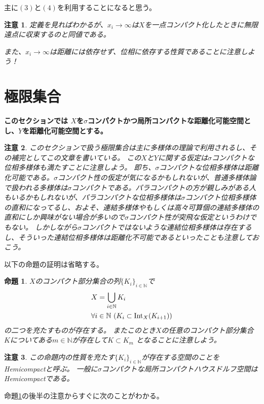\documentclass[leqno]{jsarticle}
\newtheorem{prop}[thm]{命題}
\newtheorem*{cau}{注意}
\newcommand{\nn}{\mathbb{N}}
\newcommand{\nai}{\text{{\rm Int}}}
\begin{document}
主に$(3)$と$(4)$を利用することになると思う。
\begin{cau}
定義を見ればわかるが、$x_i\to \infty$は$X$を一点コンパクト化したときに無限遠点に収束するのと同値である。
\par
また、$x_i\to\infty$は距離には依存せず、位相に依存する性質であることに注意しよう！
\end{cau}

\section{極限集合}

\textbf{このセクションでは
$X$を$\sigma$コンパクトかつ局所コンパクトな距離化可能空間とし、$Y$を距離化可能空間とする。}
\begin{cau}
このセクションで扱う極限集合は主に多様体の理論で利用されるし、その補完としてこの文章を書いている。
この$X$と$Y$に関する仮定は$\sigma$コンパクトな位相多様体も満たすことに注意しよう。
即ち、$\sigma$コンパクトな位相多様体は距離化可能である。$\sigma$コンパクト性の仮定が気になるかもしれないが、普通多様体論で扱われる多様体は$\sigma$コンパクトである。パラコンパクトの方が親しみがある人もいるかもしれないが、パラコンパクトな位相多様体は$\sigma$コンパクト位相多様体の直和になってるし、およそ、連結多様体やもしくは高々可算個の連結多様体の直和にしか興味がない場合が多いので$\sigma$コンパクト性が突飛な仮定というわけでもない。
しかしながら$\sigma$コンパクトではないような連結位相多様体は存在するし、そういった連結位相多様体は距離化不可能であるといったことも注意しておこう。
\end{cau}
以下の命題の証明は省略する。
\begin{prop}\label{cpt}
$X$のコンパクト部分集合の列$\{K_i\}_{i\in \nn}$で
\begin{align*}
& X=\bigcup_{i\in \nn}K_i\\
& \forall i\in \nn\ (K_i\subset \nai_X(K_{i+1}))
\end{align*}
の二つを充たすものが存在する。
またこのとき$X$の任意のコンパクト部分集合$K$についてある$m\in \nn$が存在して$K\subset K_m$
となることに注意しよう。
\end{prop}
\begin{cau}
この命題内の性質を充たす$\{K_i\}_{i\in \nn}$が存在する空間のことを\emph{Hemicompact}と呼ぶ。
一般に$\sigma$コンパクトな局所コンパクトハウスドルフ空間はHemicompactである。
\end{cau}
命題\ref{cpt}の後半の注意からすぐに次のことがわかる。
\end{document}
